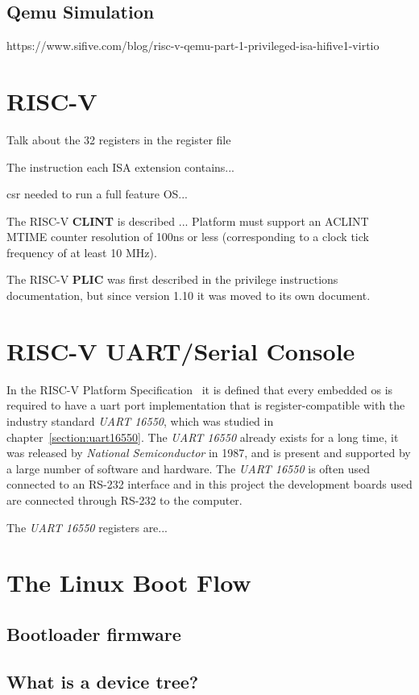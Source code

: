 \subsection{Qemu Simulation}
https://www.sifive.com/blog/risc-v-qemu-part-1-privileged-isa-hifive1-virtio

\section{RISC-V}
Talk about the 32 registers in the register file

The instruction each ISA extension contains...

\acrfull{csr} needed to run a full feature OS...

The RISC-V \textbf{CLINT} is described ...
Platform must support an ACLINT MTIME counter resolution of 100ns or less (corresponding to a clock tick frequency of at least 10 MHz).

The RISC-V \textbf{PLIC} was first described in the privilege instructions documentation, but since version 1.10 it was moved to its own document.

\section{RISC-V UART/Serial Console}
In the RISC-V Platform Specification~\cite{riscv_platform_specification} it is defined that every embedded \acrfull{os} is required to have a \acrshort{uart} port implementation that is register-compatible with the industry standard \textit{UART 16550}, which was studied in chapter~\ref{section:uart16550}. The \textit{UART 16550} already exists for a long time, it was released by \textit{National Semiconductor} in 1987, and is present and supported by a large number of software and hardware. The \textit{UART 16550} is often used connected to an RS-232 interface and in this project the development boards used are connected through RS-232 to the computer.

The \textit{UART 16550} registers are...

\section{The Linux Boot Flow}
\subsection{Bootloader firmware}
\subsection{What is a device tree?}


